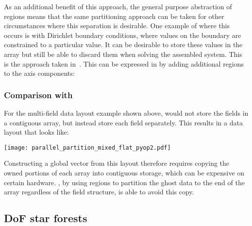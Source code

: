 \documentclass[thesis]{subfiles}
\begin{document}
As an additional benefit of this approach, the general purpose abstraction of regions means that the same partitioning approach can be taken for other circumstances where this separation is desirable.
One example of where this occurs is with Dirichlet boundary conditions, where values on the boundary are constrained to a particular value.
It can be desirable to store these values in the array but still be able to discard them when solving the assembled system.
This is the approach taken in~\cite{rothwellImplementingRestrictedFunction2024}.
This can be expressed in  by adding additional regions to the axis components:
\begin{pyinline}
\end{pyinline}

\subsubsection{Comparison with }

For the multi-field data layout example shown above,  would not store the fields in a contiguous array, but instead store each field separately.
This results in a data layout that looks like:
\begin{center}
  \texttt{[image: parallel\_partition\_mixed\_flat\_pyop2.pdf]}
\end{center}
Constructing a global vector from this layout therefore requires copying the owned portions of each array into contiguous storage, which can be expensive on certain hardware.
, by using regions to partition the ghost data to the end of the array regardless of the field structure, is able to avoid this copy.

\subsection{DoF star forests}
\label{sec:parallel_star_forests}
\end{document}
